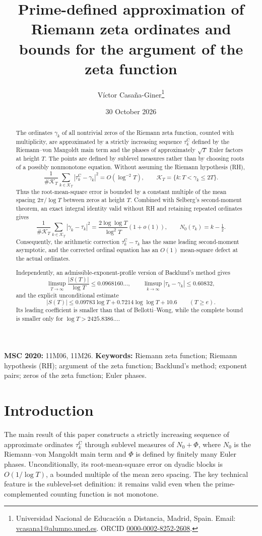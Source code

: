 \documentclass[11pt,a4paper]{article}
\title{Prime-defined approximation of Riemann zeta ordinates and bounds for the argument of the zeta function}
\author{V\'ictor Casa\~na-Giner\thanks{Universidad Nacional de Educaci\'on a Distancia, Madrid, Spain. Email: \href{mailto:vcasana1@alumno.uned.es}{vcasana1@alumno.uned.es}. ORCID \href{https://orcid.org/0000-0002-8252-2608}{0000-0002-8252-2608}.}}
\date{30 October 2026}
\numberwithin{equation}{section}
\theoremstyle{definition}
\theoremstyle{remark}
\newcommand{\Nz}{N_0} %
\newcommand{\Ph}{\Phi}
\begin{document}
\maketitle

\begin{abstract}
The ordinates $\gamma_k$ of all nontrivial zeros of the Riemann zeta function, counted with multiplicity, are approximated by a strictly increasing sequence $\tau_k^{\mathrm C}$ defined by the Riemann--von Mangoldt main term and the phases of approximately $\sqrt T$ Euler factors at height $T$. The points are defined by sublevel measures rather than by choosing roots of a possibly nonmonotone equation. Without assuming the Riemann hypothesis (RH),
\[
\frac{1}{\#\mathcal K_T}\sum_{k\in\mathcal K_T}
|\tau_k^{\mathrm C}-\gamma_k|^2=O(\log^{-2}T),
\qquad \mathcal K_T=\{k:T<\gamma_k\le2T\}.
\]
Thus the root-mean-square error is bounded by a constant multiple of the mean spacing $2\pi/\log T$ between zeros at height $T$. Combined with Selberg's second-moment theorem, an exact integral identity valid without RH and retaining repeated ordinates gives
\[
\frac1{\#\mathcal K_T}\sum_{k\in\mathcal K_T}
|\gamma_k-\tau_k|^2
=\frac{2\log\log T}{\log^2T}(1+o(1)),
\qquad N_0(\tau_k)=k-\tfrac12.
\]
Consequently, the arithmetic correction $\tau_k^{\mathrm C}-\tau_k$ has the same leading second-moment asymptotic, and the corrected ordinal equation has an $O(1)$ mean-square defect at the actual ordinates.

Independently, an admissible-exponent-profile version of Backlund's method gives
\[
\limsup_{T\to\infty}\frac{|S(T)|}{\log T}\le0.0968160\ldots,
\qquad
\limsup_{k\to\infty}|\tau_k-\gamma_k|\le0.60832,
\]
and the explicit unconditional estimate
\[
|S(T)|\le0.09783\log T+0.7214\log\log T+10.6
\qquad (T\ge e).
\]
Its leading coefficient is smaller than that of Bellotti--Wong, while the complete bound is smaller only for $\log T>2425.8386\ldots$.
\end{abstract}

\medskip
\noindent\textbf{MSC 2020:} 11M06, 11M26. \quad \textbf{Keywords:} Riemann zeta function; Riemann hypothesis (RH); argument of the zeta function; Backlund's method; exponent pairs; zeros of the zeta function; Euler phases.

\tableofcontents

\section{Introduction}\label{sec:intro}
The main result of this paper constructs a strictly increasing sequence of approximate ordinates $\tau_k^{\mathrm C}$ through sublevel measures of $\Nz+\Ph$, where $\Nz$ is the Riemann--von Mangoldt main term and $\Ph$ is defined by finitely many Euler phases. Unconditionally, its root-mean-square error on dyadic blocks is $O(1/\log T)$, a bounded multiple of the mean zero spacing. The key technical feature is the sublevel-set definition: it remains valid even when the prime-complemented counting function is not monotone.
\end{document}
